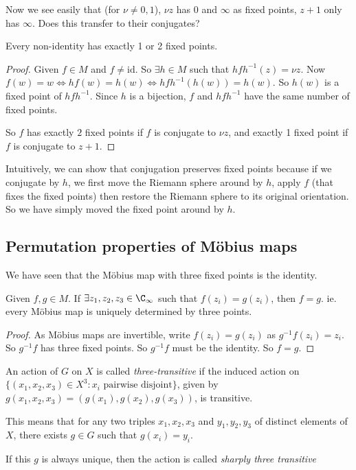 \documentclass[a4paper]{article}
\begin{document}
  Now we see easily that (for $\nu \not= 0, 1$), $\nu z$ has $0$ and $\infty$ as fixed points, $z + 1$ only has $\infty$. Does this transfer to their conjugates?

  \begin{prop}
    Every non-identity has exactly 1 or 2 fixed points. 
  \end{prop}

  \begin{proof}
    Given $f\in M$ and $f\not= \mathrm{id}$. So $\exists h\in M$ such that $hfh^{-1}(z) = \nu{z}$. Now $f(w) = w \Leftrightarrow hf(w) = h(w) \Leftrightarrow hfh^{-1}(h(w)) = h(w)$. So $h(w)$ is a fixed point of $hfh^{-1}$. Since $h$ is a bijection, $f$ and $hfh^{-1}$ have the same number of fixed points.

    So $f$ has exactly $2$ fixed points if $f$ is conjugate to $\nu z$, and exactly 1 fixed point if $f$ is conjugate to $z + 1$.
  \end{proof}
  Intuitively, we can show that conjugation preserves fixed points because if we conjugate by $h$, we first move the Riemann sphere around by $h$, apply $f$ (that fixes the fixed points) then restore the Riemann sphere to its original orientation. So we have simply moved the fixed point around by $h$.

  \subsection{Permutation properties of M\"obius maps}
  We have seen that the M\"obius map with three fixed points is the identity.

  \begin{prop}
    Given $f, g\in M$. If $\exists z_1, z_2, z_3\in \C_{\infty}$ such that $f(z_i) = g(z_i)$, then $f = g$. ie. every M\"obius map is uniquely determined by three points. 
  \end{prop}

  \begin{proof}
    As M\"obius maps are invertible, write $f(z_i) = g(z_i)$ as $g^{-1}f(z_i) = z_i$. So $g^{-1}f$ has three fixed points. So $g^{-1}f$ must be the identity. So $f = g$.
  \end{proof}

  \begin{defi}
    An action of $G$ on $X$ is called \emph{three-transitive} if the induced action on $\{(x_1, x_2, x_3)\in X^3: x_i\text{ pairwise disjoint}\}$, given by $g(x_1, x_2, x_3) = (g(x_1), g(x_2), g(x_3))$, is transitive.

    This means that for any two triples $x_1, x_2, x_3$ and $y_1, y_2, y_3$ of distinct elements of $X$, there exists $g\in G$ such that $g(x_i) = y_i$.

    If this $g$ is always unique, then the action is called \emph{sharply three transitive}
  \end{defi}
\end{document}
